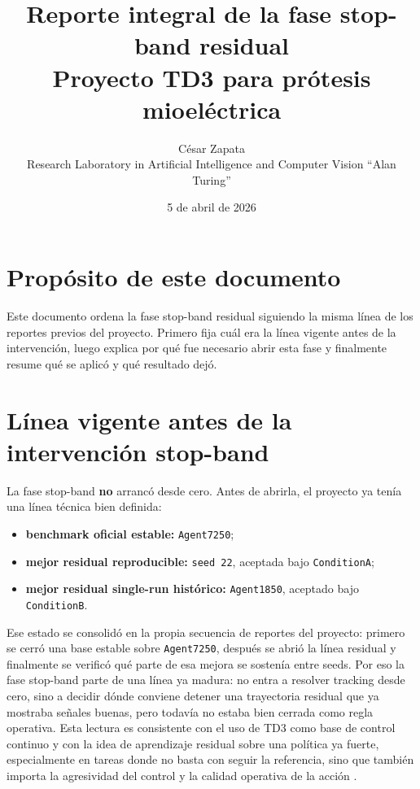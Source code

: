\documentclass[11pt,a4paper]{article}
\title{Reporte integral de la fase stop-band residual\\\large Proyecto TD3 para pr\'otesis mioel\'ectrica}
\author{C\'esar Zapata\\Research Laboratory in Artificial Intelligence and Computer Vision ``Alan Turing''}
\date{5 de abril de 2026}
\begin{document}
\maketitle

\section*{Prop\'osito de este documento}
Este documento ordena la fase stop-band residual siguiendo la misma l\'inea de los reportes previos del proyecto. Primero fija cu\'al era la l\'inea vigente antes de la intervenci\'on, luego explica por qu\'e fue necesario abrir esta fase y finalmente resume qu\'e se aplic\'o y qu\'e resultado dej\'o.

\section*{L\'inea vigente antes de la intervenci\'on stop-band}
La fase stop-band \textbf{no} arranc\'o desde cero. Antes de abrirla, el proyecto ya ten\'ia una l\'inea t\'ecnica bien definida:
\begin{itemize}
\item \textbf{benchmark oficial estable:} \texttt{Agent7250};
\item \textbf{mejor residual reproducible:} \texttt{seed 22}, aceptada bajo \texttt{ConditionA};
\item \textbf{mejor residual single-run hist\'orico:} \texttt{Agent1850}, aceptado bajo \texttt{ConditionB}.
\end{itemize}

Ese estado se consolid\'o en la propia secuencia de reportes del proyecto: primero se cerr\'o una base estable sobre \texttt{Agent7250}, despu\'es se abri\'o la l\'inea residual y finalmente se verific\'o qu\'e parte de esa mejora se sosten\'ia entre seeds. Por eso la fase stop-band parte de una l\'inea ya madura: no entra a resolver tracking desde cero, sino a decidir d\'onde conviene detener una trayectoria residual que ya mostraba se\~nales buenas, pero todav\'ia no estaba bien cerrada como regla operativa. Esta lectura es consistente con el uso de TD3 como base de control continuo y con la idea de aprendizaje residual sobre una pol\'itica ya fuerte, especialmente en tareas donde no basta con seguir la referencia, sino que tambi\'en importa la agresividad del control y la calidad operativa de la acci\'on \citep{fujimoto2018td3,silver2018residual,chen2023review,done2025prostheticrl}.
\end{document}
